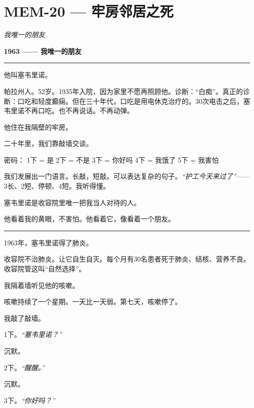 \section*{\textbf{MEM-20} --- 牢房邻居之死}

\noindent \textit{我唯一的朋友}

\noindent \textbf{1963 —— 我唯一的朋友}

\vspace{0.5em}\noindent\rule{\textwidth}{0.5pt}\vspace{0.5em}

\noindent 他叫塞韦里诺。

\noindent 帕拉州人。52岁。1935年入院，因为家里不愿再照顾他。诊断：“白痴”。真正的诊断：口吃和轻度癫痫。但在三十年代，口吃是用电休克治疗的。30次电击之后，塞韦里诺不再口吃。也不再说话。不再动弹。

\noindent 他住在我隔壁的牢房。

\noindent 二十年里，我们靠敲墙交谈。

\noindent 密码：
1下 = 是
2下 = 不是
3下 = 你好吗
4下 = 我饿了
5下 = 我害怕

\noindent 我们发展出一门语言。长敲，短敲。可以表达复杂的句子。\textit{“护工今天来过了”}——3长、2短、停顿、4短。我听得懂。

\noindent 塞韦里诺是收容院里唯一把我当人对待的人。

\noindent 他看着我的黄眼，不害怕。他看着它，像看着一个朋友。

\vspace{0.5em}\noindent\rule{\textwidth}{0.5pt}\vspace{0.5em}

\noindent 1963年，塞韦里诺得了肺炎。

\noindent 收容院不治肺炎。让它自生自灭。每个月有30名患者死于肺炎、结核、营养不良。收容院管这叫“自然选择”。

\noindent 我隔着墙听见他的咳嗽。

\noindent 咳嗽持续了一个星期。一天比一天弱。第七天，咳嗽停了。

\noindent 我敲了敲墙。

\noindent 1下。\textit{“塞韦里诺？”}

\noindent 沉默。

\noindent 2下。\textit{“醒醒。”}

\noindent 沉默。

\noindent 3下。\textit{“你好吗？”}


